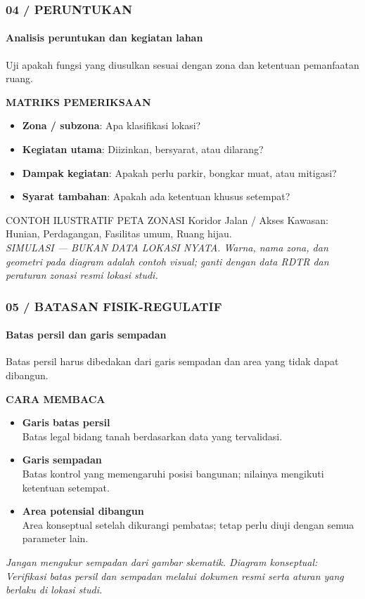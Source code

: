 \documentclass[../main.tex]{subfiles}
\begin{document}
\begin{frame}[mytitle=imageplus,t]
	\frametitle{04 / PERUNTUKAN}
	\framesubtitle{Analisis peruntukan dan kegiatan lahan}

	Uji apakah fungsi yang diusulkan sesuai dengan zona dan ketentuan pemanfaatan ruang.

	\vspace{0.3cm}
	\textbf{MATRIKS PEMERIKSAAN}
	\begin{itemize}
		\item \textbf{Zona / subzona}: Apa klasifikasi lokasi?
		\item \textbf{Kegiatan utama}: Diizinkan, bersyarat, atau dilarang?
		\item \textbf{Dampak kegiatan}: Apakah perlu parkir, bongkar muat, atau mitigasi?
		\item \textbf{Syarat tambahan}: Apakah ada ketentuan khusus setempat?
	\end{itemize}

	\begin{alertblock}{CONTOH ILUSTRATIF PETA ZONASI}
		Koridor Jalan / Akses Kawasan: Hunian, Perdagangan, Fasilitas umum, Ruang hijau. \\
		\textit{SIMULASI — BUKAN DATA LOKASI NYATA. Warna, nama zona, dan geometri pada diagram adalah contoh visual; ganti dengan data RDTR dan peraturan zonasi resmi lokasi studi.}
	\end{alertblock}
\end{frame}

\begin{frame}[mytitle=standard,t]
	\frametitle{05 / BATASAN FISIK-REGULATIF}
	\framesubtitle{Batas persil dan garis sempadan}

	Batas persil harus dibedakan dari garis sempadan dan area yang tidak dapat dibangun.

	\vspace{0.3cm}
	\textbf{CARA MEMBACA}
	\begin{itemize}
		\item \textbf{Garis batas persil}\\ Batas legal bidang tanah berdasarkan data yang tervalidasi.
		\item \textbf{Garis sempadan}\\ Batas kontrol yang memengaruhi posisi bangunan; nilainya mengikuti ketentuan setempat.
		\item \textbf{Area potensial dibangun}\\ Area konseptual setelah dikurangi pembatas; tetap perlu diuji dengan semua parameter lain.
	\end{itemize}

	\vfill
	\footnotesize\textit{Jangan mengukur sempadan dari gambar skematik. Diagram konseptual: Verifikasi batas persil dan sempadan melalui dokumen resmi serta aturan yang berlaku di lokasi studi.}
\end{frame}
\end{document}
